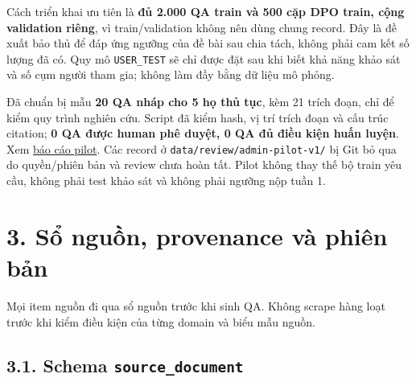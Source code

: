 \documentclass[11pt,a4paper]{article}
\begin{document}
Cách triển khai ưu tiên là \textbf{đủ 2.000 QA train và 500 cặp DPO
train, cộng validation riêng}, vì train/validation không nên dùng chung
record. Đây là đề xuất bảo thủ để đáp ứng ngưỡng của đề bài sau chia
tách, không phải cam kết số lượng đã có. Quy mô \nolinkurl{USER_TEST} sẽ
chỉ được đặt sau khi biết khả năng khảo sát và số cụm người tham gia;
không làm đầy bằng dữ liệu mô phỏng.

Đã chuẩn bị mẫu \textbf{20 QA nháp cho 5 họ thủ tục}, kèm 21 trích đoạn,
chỉ để kiểm quy trình nghiên cứu. Script đã kiểm hash, vị trí trích đoạn
và cấu trúc citation; \textbf{0 QA được human phê duyệt, 0 QA đủ điều
kiện huấn luyện}. Xem \href{../data/admin-pilot.md}{báo cáo pilot}. Các
record ở \nolinkurl{data/review/admin-pilot-v1/} bị Git bỏ qua do
quyền/phiên bản và review chưa hoàn tất. Pilot không thay thế bộ train
yêu cầu, không phải test khảo sát và không phải ngưỡng nộp tuần 1.

\section{3. Sổ nguồn, provenance và phiên
bản}\label{sux1ed5-nguux1ed3n-provenance-vuxe0-phiuxean-bux1ea3n}

Mọi item nguồn đi qua sổ nguồn trước khi sinh QA. Không scrape hàng loạt
trước khi kiểm điều kiện của từng domain và biểu mẫu nguồn.

\subsection{\texorpdfstring{3.1. Schema
\nolinkurl{source_document}}{3.1. Schema }}\label{schema-source_document}
\end{document}
